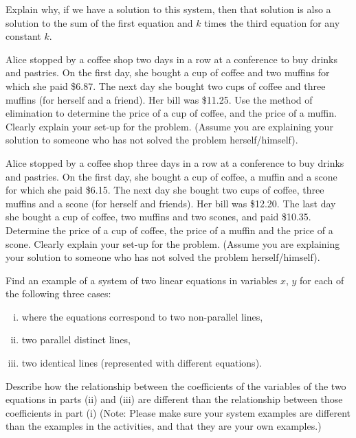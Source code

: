    \item Explain why, if we have a solution to this system, then that solution is also a solution to the sum of the first equation and $k$ times the third equation for any constant $k$. 

	\ea

\item Alice stopped by a coffee shop two days in a row at a conference to buy drinks and pastries. On the first day, she bought a cup of coffee and two muffins for which she paid \$6.87. The next day she bought two cups of coffee and three muffins (for herself and a friend). Her bill was \$11.25. Use the method of elimination to determine the price of a cup of coffee, and the price of a muffin. Clearly explain your set-up for the problem. (Assume you are explaining your solution to someone who has not solved the problem herself/himself).

\item Alice stopped by a coffee shop three days in a row at a conference to buy drinks and pastries. On the first day, she bought a cup of coffee, a muffin and a scone for which she paid \$6.15. The next day she bought two cups of coffee, three muffins and a scone (for herself and friends). Her bill was \$12.20. The last day she bought a cup of coffee, two muffins and two scones, and paid \$10.35. Determine the price of a cup of coffee, the price of a muffin and the price of a scone. Clearly explain your set-up for the problem. (Assume you are explaining your solution to someone who has not solved the problem herself/himself).

\item 
	\ba
	\item Find an example of a system of two linear equations in variables $x$, $y$ for each of the following three cases: 
		\begin{enumerate}[i.]
		\item where the equations correspond to two non-parallel lines, 
		\item two parallel distinct lines, 
		\item two identical lines (represented with different equations). 
		\end{enumerate}
	\item Describe how the relationship between the coefficients of the variables of the two equations in parts (ii) and (iii) are different than the relationship between those coefficients in part (i) (Note: Please make sure your system examples are different than the examples in the activities, and that they are your own examples.)
	\ea

